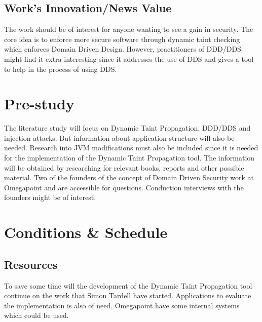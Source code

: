 \documentclass{../kththesis}
\begin{document}
\section{Work's Innovation/News Value}
The work should be of interest for anyone wanting to see a gain in security. The core idea is to enforce more secure software through dynamic taint checking which enforces Domain Driven Design. However, practitioners of DDD/DDS might find it extra interesting since it addresses the use of DDS and gives a tool to help in the process of using DDS.



\chapter{Pre-study}
The literature study will focus on Dynamic Taint Propagation, DDD/DDS and injection attacks. But information about application structure will also be needed. Research into JVM modifications must also be included since it is needed for the implementation of the Dynamic Taint Propagation tool. The information will be obtained by researching for relevant books, reports and other possible material. Two of the founders of the concept of Domain Driven Security work at Omegapoint and are accessible for questions. Conduction interviews with the founders might be of interest.



\chapter{Conditions \& Schedule}
\section{Resources}
To save some time will the development of the Dynamic Taint Propagation tool continue on the work that Simon Tardell have started. Applications to evaluate the implementation is also of need. Omegapoint have some internal systems which could be used.
\end{document}
